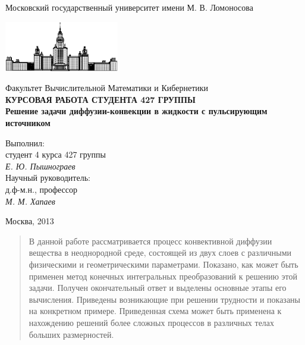 \documentclass[12pt, a4paper]{article}
\begin{document}
\begin{titlepage}
\begin{center}
    Московский государственный университет имени М. В. Ломоносова

    \bigskip
    \includegraphics[width=50mm]{msu.eps}

    \bigskip
    Факультет Вычислительной Математики и Кибернетики\\[10mm]

    \textsf{\large\bfseries
        КУРСОВАЯ РАБОТА СТУДЕНТА 427 ГРУППЫ\\[10mm]
        Решение задачи диффузии-конвекции в жидкости с пульсирующим источником
    }\\[10mm]

    \begin{flushright}
        \parbox{0.5\textwidth}{
            Выполнил:\\
            студент 4 курса 427 группы\\
            \emph{Е. Ю. Пышнограев}\\[5mm]
            Научный руководитель:\\
            д.ф-м.н., профессор\\
            \emph{М. М. Хапаев}
        }
    \end{flushright}

    \vspace{\fill}
    Москва, 2013
\end{center}
\end{titlepage}

\newpage
\begin{abstract}
  В данной работе рассматривается процесс конвективной диффузии вещества в неоднородной среде, состоящей из двух слоев с различными
  физическими и геометрическими параметрами. Показано, как может быть применен метод конечных интегральных преобразований к решению этой задачи.
  Получен окончательный ответ и выделены основные этапы его вычисления. Приведены возникающие при решении трудности и показаны
  на конкретном примере. Приведенная схема может быть применена к нахождению решений более сложных процессов в различных телах больших размерностей.
\end{abstract}

\newpage
\renewcommand{\contentsname}{Содержание}
\tableofcontents
\end{document}
